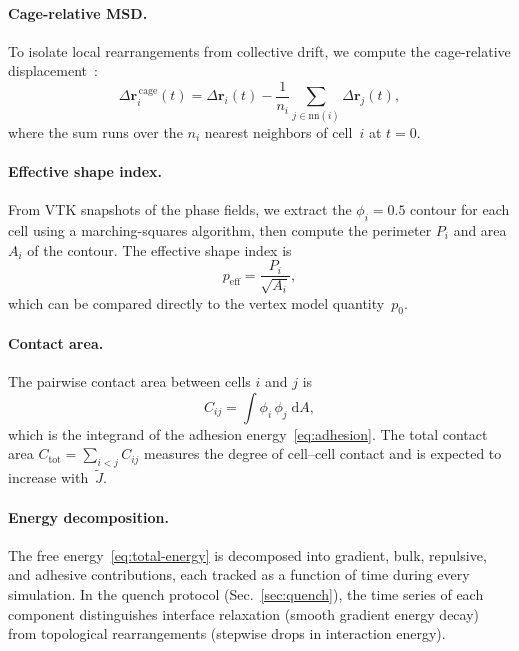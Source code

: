 \documentclass[aps,pre,twocolumn,superscriptaddress,longbibliography]{revtex4-2}
\newcommand{\dd}{\mathrm{d}}               %
\newcommand{\peff}{p_{\mathrm{eff}}}       %
\newcommand{\Jk}{\tilde{J}}                %
\newcommand{\phii}{\phi_i}                 %
\newcommand{\phij}{\phi_j}                 %
\begin{document}
\paragraph{Cage-relative MSD.}
To isolate local rearrangements from collective drift, we compute the
cage-relative displacement~\cite{Bi2016}:
%
\begin{equation}
  \Delta \bm{r}_i^{\,\mathrm{cage}}(t)
    = \Delta\bm{r}_i(t)
      - \frac{1}{n_i}\sum_{j \in \mathrm{nn}(i)} \Delta\bm{r}_j(t),
\end{equation}
%
where the sum runs over the $n_i$ nearest neighbors of cell~$i$ at $t = 0$.

\paragraph{Effective shape index.}
From VTK snapshots of the phase fields, we extract the $\phii = 0.5$ contour
for each cell using a marching-squares algorithm, then compute the perimeter
$P_i$ and area $A_i$ of the contour.  The effective shape index is
%
\begin{equation}
  \peff = \frac{P_i}{\sqrt{A_i}},
  \label{eq:peff}
\end{equation}
%
which can be compared directly to the vertex model quantity~$p_0$.

\paragraph{Contact area.}
The pairwise contact area between cells $i$ and $j$ is
%
\begin{equation}
  C_{ij} = \int \phii\,\phij\;\dd A,
  \label{eq:contact-area}
\end{equation}
%
which is the integrand of the adhesion energy~\eqref{eq:adhesion}.  The total
contact area $C_{\mathrm{tot}} = \sum_{i<j} C_{ij}$ measures the degree of
cell--cell contact and is expected to increase with~$\Jk$.

\paragraph{Energy decomposition.}
The free energy~\eqref{eq:total-energy} is decomposed into gradient, bulk,
repulsive, and adhesive contributions, each tracked as a function of time
during every simulation.  In the quench protocol (Sec.~\ref{sec:quench}),
the time series of each component distinguishes interface relaxation (smooth
gradient energy decay) from topological rearrangements (stepwise drops in
interaction energy).
\end{document}
